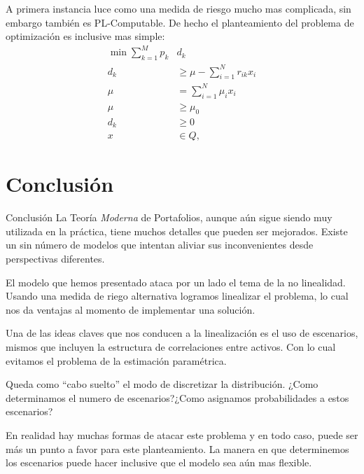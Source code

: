 \documentclass{beamer}
\begin{document}
    \begin{frame}
        A primera instancia luce como una medida de riesgo mucho mas complicada, sin embargo también es PL-Computable. De hecho el planteamiento del problema de optimización es inclusive mas simple: 
        \begin{align*}
            \min \sum_{k=1}^M p_k&d_k \\
            d_k & \geq \mu-\sum_{i=1}^{N} r_{ik}x_i\\
            \mu &= \sum_{i=1}^N\mu_i x_i\\
            \mu&\geq \mu_0\\
            d_k& \geq 0\\
            x& \in Q,
        \end{align*}
    \end{frame}
    \section[Conclusión]{Conclusión}
    \begin{frame}{Conclusión}
        La Teoría \emph{Moderna} de Portafolios, aunque aún sigue siendo muy utilizada en la práctica, tiene muchos detalles que pueden ser mejorados. Existe un sin número de modelos que intentan aliviar sus inconvenientes desde perspectivas diferentes. 
    \par\medskip
    El modelo que hemos presentado ataca por un lado el tema de la no linealidad. Usando una medida de riego alternativa logramos linealizar el problema, lo cual nos da ventajas al momento de implementar una solución.
    \par\medskip
    Una de las ideas claves que nos conducen a la linealización es el uso de escenarios, mismos que incluyen la estructura de correlaciones entre activos. Con lo cual evitamos el problema de la estimación paramétrica.
    \par\medskip
    Queda como ``cabo suelto'' el modo de discretizar la distribución. ¿Como determinamos el numero de escenarios?¿Como asignamos probabilidades a estos escenarios?
    \par\medskip
    En realidad hay muchas formas de atacar este problema y en todo caso, puede ser más un punto a favor para este planteamiento. La manera en que determinemos los escenarios puede hacer inclusive que el modelo sea aún mas flexible.
    \end{frame}
    
\end{document}
